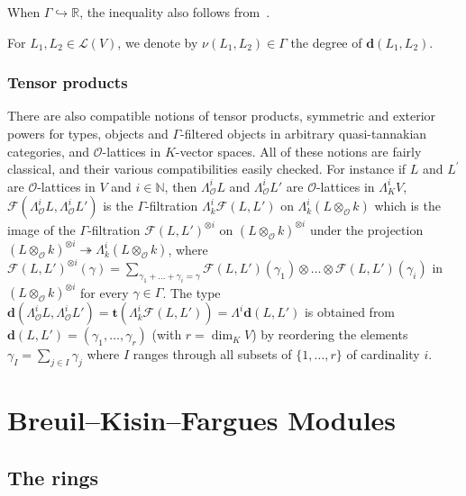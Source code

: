 \begin{rema}
When $\Gamma\hookrightarrow\mathbb{R}$, the inequality also follows from~\cite[5.2.10 \& 6.1]{Co14}.
\end{rema}

For $L_{1},L_{2}\in\mathcal{L}(V)$, we denote by $\nu(L_{1},L_{2})\in\Gamma$ the degree of $\mathbf{d}(L_{1},L_{2})$.

\subsubsection{Tensor products}\label{subsec:TensorProd}

There are also compatible notions of tensor products, symmetric and exterior powers for types, objects and $\Gamma$-filtered objects in arbitrary quasi-tannakian categories, and $\mathcal{O}$-lattices in $K$-vector spaces. All of these notions are fairly classical, and their various compatibilities easily checked. For instance if $L$ and $L^{\prime}$ are $\mathcal{O}$-lattices in $V$ and $i\in\mathbb{N}$, then $\Lambda_{\mathcal{O}}^{i}L$ and $\Lambda_{\mathcal{O}}^{i}L'$ are $\mathcal{O}$-lattices in $\Lambda_{K}^{i}V$, $\mathcal{F}(\Lambda_{\mathcal{O}}^{i}L,\Lambda_{\mathcal{O}}^{i}L')$ is the $\Gamma$-filtration $\Lambda_{k}^{i}\mathcal{F}(L,L')$ on $\Lambda_{k}^{i}(L\otimes_{\mathcal{O}}k)$ which is the image of the $\Gamma$-filtration $\mathcal{F}(L,L')^{\otimes i}$ on $(L\otimes_{\mathcal{O}}k)^{\otimes i}$ under the projection $(L\otimes_{\mathcal{O}}k)^{\otimes i}\twoheadrightarrow\Lambda_{k}^{i}(L\otimes_{\mathcal{O}}k)$, where $\mathcal{F}(L,L')^{\otimes i}(\gamma)=\sum_{\gamma_{1}+\dots+\gamma_{i}=\gamma}\mathcal{F}(L,L')(\gamma_{1})\otimes\dots\otimes\mathcal{F}(L,L')(\gamma_{i})$ in $(L\otimes_{\mathcal{O}}k)^{\otimes i}$ for every $\gamma\in\Gamma$. The type $\mathbf{d}(\Lambda_{\mathcal{O}}^{i}L,\Lambda_{\mathcal{O}}^{i}L')=\mathbf{t}(\Lambda_{k}^{i}\mathcal{F}(L,L'))=\Lambda^{i}\mathbf{d}(L,L')$ is obtained from $\mathbf{d}(L,L')=(\gamma_{1},\dots,\gamma_{r})$ (with $r=\dim_{K}V$) by reordering the elements $\gamma_{I}=\sum_{j\in I}\gamma_{j}$ where $I$ ranges through all subsets of $\{1,\dots,r\}$ of cardinality $i$.


\section{Breuil--Kisin--Fargues Modules}\label{sec:BKF-Modules}

\subsection{The rings}\label{subsec:TheRings}

